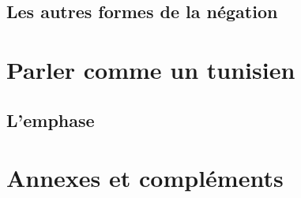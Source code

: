 \documentclass[draft]{book}
\begin{document}
\chapter{Les autres formes de la négation}

\part{Parler comme un tunisien}

\chapter{L'emphase}\label{Emphase}


\part{Annexes et compléments}
\appendix


\end{document}
